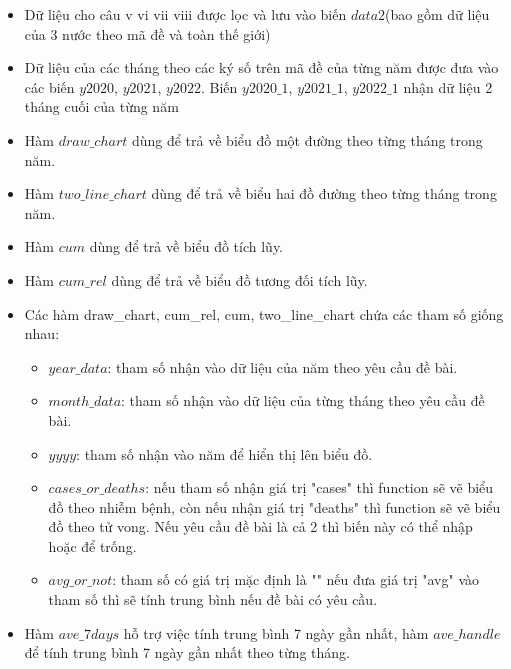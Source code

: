 \documentclass[a4paper]{article}
\theoremstyle{definition}
\begin{document}
\begin{enumerate}[i)]
\begin{itemize}
    \item Dữ liệu cho câu v vi vii viii được lọc và lưu vào biến $data2$(bao gồm dữ liệu của 3 nước theo mã đề và toàn thế giới)\\
    \item Dữ liệu của các tháng theo các ký số trên mã đề của từng năm được đưa vào các biến $y2020$, $y2021$, $y2022$. Biến $y2020\_1$, $y2021\_1$, $y2022\_1$ nhận dữ liệu 2 tháng cuối của từng năm\\
    \item Hàm $draw\_chart$ dùng để trả về biểu đồ một đường theo từng tháng trong năm.\\
    \item Hàm $two\_line\_chart$ dùng để trả về biểu hai đồ đường theo từng tháng trong năm.\\
    \item Hàm $cum$ dùng để trả về biểu đồ tích lũy.\\
    \item Hàm $cum\_rel$ dùng để trả về biểu đồ tương đối tích lũy.\\
    \item Các hàm draw\_chart, cum\_rel, cum, two\_line\_chart chứa các tham số giống nhau:\\
        \begin{itemize}
            \item $year\_data$: tham số nhận vào dữ liệu của năm theo yêu cầu đề bài.\\
            \item $month\_data$: tham số nhận vào dữ liệu của từng tháng theo yêu cầu đề bài.\\
            \item $yyyy$: tham số nhận vào năm để hiển thị lên biểu đồ.\\
            \item $cases\_or\_deaths$: nếu tham số nhận giá trị "cases" thì function sẽ vẽ biểu đồ theo nhiễm bệnh, còn nếu nhận giá trị "deaths" thì function sẽ vẽ biểu đồ theo tử vong. Nếu yêu cầu đề bài là cả 2 thì biến này có thể nhập hoặc để trống.\\
            \item $avg\_or\_not$: tham số có giá trị mặc định là "" nếu đưa giá trị "avg" vào tham số thì sẽ tính trung bình nếu đề bài có yêu cầu.
        \end{itemize}
    \item Hàm $ave\_7days$ hỗ trợ việc tính trung bình 7 ngày gần nhất, hàm $ave\_handle$ để tính trung bình 7 ngày gần nhất theo từng tháng.\\

\end{itemize}
\end{enumerate}
\end{document}
